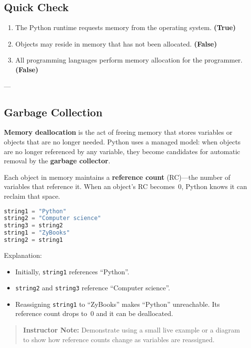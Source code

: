 \subsection*{Quick Check}

\begin{enumerate}
  \item The Python runtime requests memory from the operating system. \textbf{(True)}
  \item Objects may reside in memory that has not been allocated. \textbf{(False)}
  \item All programming languages perform memory allocation for the programmer. \textbf{(False)}
\end{enumerate}

---

\subsection*{Garbage Collection}

\textbf{Memory deallocation} is the act of freeing memory that stores variables or objects
that are no longer needed.  
Python uses a managed model: when objects are no longer referenced by any variable, they
become candidates for automatic removal by the \textbf{garbage collector}.

Each object in memory maintains a \textbf{reference count} (RC)---the number of variables
that reference it. When an object's RC becomes~0, Python knows it can reclaim that space.

\begin{lstlisting}[language=Python, caption={Reference counting in Python}]
string1 = "Python"
string2 = "Computer science"
string3 = string2
string1 = "ZyBooks"
string2 = string1
\end{lstlisting}

Explanation:
\begin{itemize}
  \item Initially, \texttt{string1} references ``Python''.
  \item \texttt{string2} and \texttt{string3} reference ``Computer science''.
  \item Reassigning \texttt{string1} to ``ZyBooks'' makes ``Python'' unreachable.
        Its reference count drops to~0 and it can be deallocated.
\end{itemize}

\begin{quote}
\textbf{Instructor Note:} Demonstrate using a small live example or a diagram to show how
reference counts change as variables are reassigned.
\end{quote}

